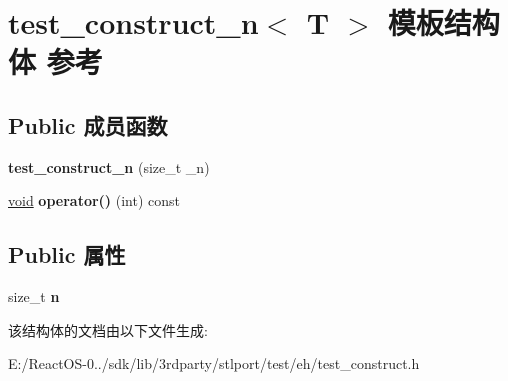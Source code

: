 \hypertarget{structtest__construct__n}{}\section{test\+\_\+construct\+\_\+n$<$ T $>$ 模板结构体 参考}
\label{structtest__construct__n}
\subsection*{Public 成员函数}
\begin{DoxyCompactItemize}
\item 
\mbox{\label{structtest__construct__n_a21dd1b14787fcf9f6ee01bf8783a608b}} 
{\bfseries test\+\_\+construct\+\_\+n} (size\+\_\+t \+\_\+n)
\item 
\mbox{\label{structtest__construct__n_a3e57086e68728bda0875f1135905ed80}} 
\hyperlink{interfacevoid}{void} {\bfseries operator()} (int) const
\end{DoxyCompactItemize}
\subsection*{Public 属性}
\begin{DoxyCompactItemize}
\item 
\mbox{\label{structtest__construct__n_a3570797ee4b2a4574876d7c016bf1a8f}} 
size\+\_\+t {\bfseries n}
\end{DoxyCompactItemize}


该结构体的文档由以下文件生成\+:\begin{DoxyCompactItemize}
\item 
E\+:/\+React\+O\+S-\/0../sdk/lib/3rdparty/stlport/test/eh/test\+\_\+construct.\+h\end{DoxyCompactItemize}
